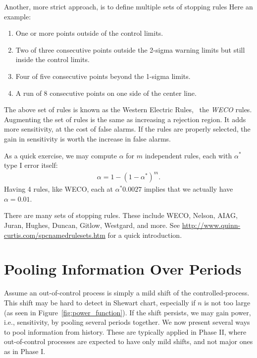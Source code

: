 Another, more strict approach, is to define multiple sets of stopping rules
Here an example:
\begin{enumerate}
\item One or more points outside of the control limits.
\item Two of three consecutive points outside the 2-sigma warning limits but still inside the control limits.
\item Four of five consecutive points beyond the 1-sigma limits.
\item A run of 8 consecutive points on one side of the center line.
\end{enumerate}
The above set of rules is known as the Western Electric Rules, \aka\, the \emph{WECO} rules.
Augmenting the set of rules is the same as increasing a rejection region. It adds more sensitivity, at the cost of false alarms. If the rules are properly selected, the gain in sensitivity is worth the increase in false alarms.

As a quick exercise, we may compute $\alpha$  for $m$ independent rules, each with $\alpha^*$ type I error itself:
\begin{align}
	\alpha=1-(1-\alpha^*)^m.
\end{align}
Having 4 rules, like WECO, each at $\alpha^*0.0027$ implies that we actually have $\alpha=0.01$.

\begin{extra}
There are many sets of stopping rules. 
These include WECO, Nelson, AIAG, Juran, Hughes, Duncan, Gitlow, Westgard, and more. 
See \url{http://www.quinn-curtis.com/spcnamedrulesets.htm} for a quick introduction.
\end{extra}



\section{Pooling Information Over Periods}
\label{sec:running_windows}

Assume an out-of-control process is simply a mild shift of the controlled-process.
This shift may be hard to detect in Shewart chart, especially if $n$ is not too large (as seen in Figure~\ref{fig:power_function}).  
If the shift persists, we may gain power, i.e., sensitivity, by pooling several periods together. 
We now present several ways to pool information from history. These are typically applied in Phase II, where out-of-control processes are expected to have only mild shifts, and not major ones as in Phase I. 



